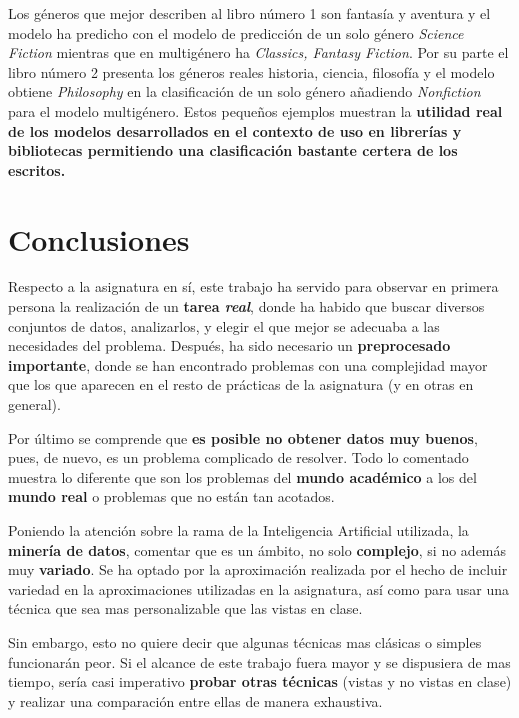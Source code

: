 \documentclass[12pt,a4paper, xcolor=table]{article}
\begin{document}
Los géneros que mejor describen al libro número 1 son fantasía y aventura y el modelo ha predicho con el modelo de predicción de un solo género \textit{Science Fiction} mientras que en multigénero ha \textit{Classics, Fantasy Fiction}. Por su parte el libro número 2 presenta los géneros reales historia, ciencia, filosofía y el modelo obtiene \textit{Philosophy} en la clasificación de un solo género añadiendo \textit{Nonfiction} para el modelo multigénero. Estos pequeños ejemplos muestran la\textbf{ utilidad real de los modelos desarrollados en el contexto de uso en librerías y bibliotecas permitiendo una clasificación bastante certera de los escritos.
}

\newpage

\section{Conclusiones}
Respecto a la asignatura en sí, este trabajo ha servido para observar en primera persona la realización de un \textbf{tarea \textit{real}}, donde ha habido que buscar diversos conjuntos de datos, analizarlos, y elegir el que mejor se adecuaba a las necesidades del problema. Después, ha sido necesario un \textbf{preprocesado importante}, donde se han encontrado problemas con una complejidad mayor que los que aparecen en el resto de prácticas de la asignatura (y en otras en general). 

\vspace{3mm}

Por último se comprende que \textbf{es posible no obtener datos muy buenos}, pues, de nuevo, es un problema complicado de resolver.  Todo lo comentado muestra lo diferente que son los problemas del \textbf{mundo académico} a los del \textbf{mundo real} o problemas que no están tan acotados.

\vspace{3mm}

Poniendo la atención sobre la rama de la Inteligencia Artificial utilizada, la \textbf{minería de datos}, comentar que es un ámbito, no solo \textbf{complejo}, si no además muy \textbf{variado}. Se ha optado por la aproximación realizada por el hecho de incluir variedad en la aproximaciones utilizadas en la asignatura, así como para usar una técnica que sea mas personalizable que las vistas en clase. 

\vspace{3mm}

Sin embargo, esto no quiere decir que algunas técnicas mas clásicas o simples funcionarán peor. Si el alcance de este trabajo fuera mayor y se dispusiera de mas tiempo, sería casi imperativo \textbf{probar otras técnicas} (vistas y no vistas en clase) y realizar una comparación entre ellas de manera exhaustiva.

\clearpage



\end{document}

